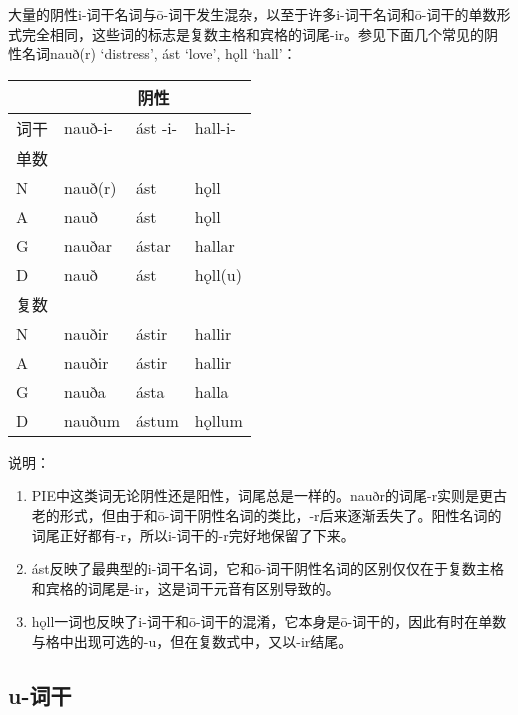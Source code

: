 大量的阴性i-词干名词与ō-词干发生混杂，以至于许多i-词干名词和ō-词干的单数形式完全相同，这些词的标志是复数主格和宾格的词尾-ir。参见下面几个常见的阴性名词nauð(r)
`distress', ást `love', hǫll `hall'：

\begin{longtable}{llll}
  \toprule
     & \multicolumn{3}{c}{阴性}                     \\
  \midrule
  \endhead
  \bottomrule
  \endfoot
  词干 & nauð-i-                & ást -i- & hall-i- \\
  单数 &                        &         &         \\
  N  & nauð(r)                & ást     & hǫll    \\
  A  & nauð                   & ást     & hǫll    \\
  G  & nauðar                 & ástar   & hallar  \\
  D  & nauð                   & ást     & hǫll(u) \\
  复数 &                        &         &         \\
  N  & nauðir                 & ástir   & hallir  \\
  A  & nauðir                 & ástir   & hallir  \\
  G  & nauða                  & ásta    & halla   \\
  D  & nauðum                 & ástum   & hǫllum  \\
\end{longtable}

说明：

\begin{enumerate}
  \def\labelenumi{\arabic{enumi})}
  \item
        PIE中这类词无论阴性还是阳性，词尾总是一样的。nauðr的词尾-r实则是更古老的形式，但由于和ō-词干阴性名词的类比，-r后来逐渐丢失了。阳性名词的词尾正好都有-r，所以i-词干的-r完好地保留了下来。
  \item
        ást反映了最典型的i-词干名词，它和ō-词干阴性名词的区别仅仅在于复数主格和宾格的词尾是-ir，这是词干元音有区别导致的。
  \item
        hǫll一词也反映了i-词干和ō-词干的混淆，它本身是ō-词干的，因此有时在单数与格中出现可选的-u，但在复数式中，又以-ir结尾。
\end{enumerate}

\subsection{u-词干}\label{u-词干}

